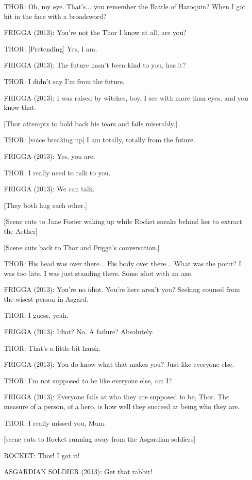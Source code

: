 THOR: Oh, my eye. That's... you remember the Battle of Haroquin? When I got hit in the face with a broadsword?

FRIGGA (2013): You're not the Thor I know at all, are you?

THOR: [Pretending] Yes, I am.

FRIGGA (2013): The future hasn't been kind to you, has it?

THOR: I didn't say I'm from the future.

FRIGGA (2013): I was raised by witches, boy. I see with more than eyes, and you know that.

[Thor attempts to hold back his tears and fails miserably.]

THOR: [voice breaking up] I am totally, totally from the future.

FRIGGA (2013): Yes, you are.

THOR: I really need to talk to you.

FRIGGA (2013): We can talk.

[They both hug each other.]

[Scene cuts to Jane Foster waking up while Rocket sneaks behind her to extract the Aether]

[Scene cuts back to Thor and Frigga's conversation.]

THOR: His head was over there... His body over there... What was the point? I was too late. I was just standing there. Some idiot with an axe.

FRIGGA (2013): You're no idiot. You're here aren't you? Seeking counsel from the wisest person in Asgard.

THOR: I guess, yeah.

FRIGGA (2013): Idiot? No. A failure? Absolutely.

THOR: That's a little bit harsh.

FRIGGA (2013): You do know what that makes you? Just like everyone else.

THOR: I'm not supposed to be like everyone else, am I?

FRIGGA (2013): Everyone fails at who they are supposed to be, Thor. The measure of a person, of a hero, is how well they succeed at being who they are.

THOR: I really missed you, Mum.

[scene cuts to Rocket running away from the Asgardian soldiers]

ROCKET: Thor! I got it!

ASGARDIAN SOLDIER (2013): Get that rabbit!

